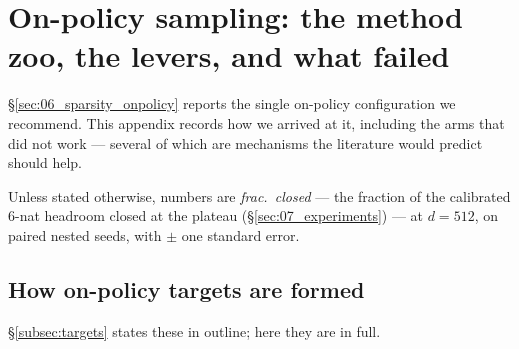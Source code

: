 \section{On-policy sampling: the method zoo, the levers, and what failed}
\label{sec:B_onpolicy_zoo}

\S\ref{sec:06_sparsity_onpolicy} reports the single on-policy configuration we
recommend. This appendix records how we arrived at it, including the arms that did not
work --- several of which are mechanisms the literature would predict should
help.

Unless stated otherwise, numbers are \emph{frac.\ closed} --- the fraction of
the calibrated $6$-nat headroom closed at the plateau (\S\ref{sec:07_experiments})
--- at $d=512$, on paired nested seeds, with $\pm$ one standard error.

\subsection{How on-policy targets are formed}
\label{subsec:b-targets}
\S\ref{subsec:targets} states these in outline; here they are in full.

